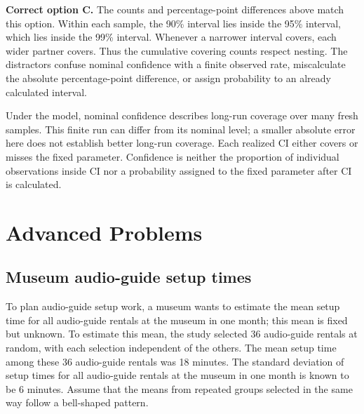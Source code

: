 \textbf{Correct option C.} The counts and percentage-point differences above match this option. Within each sample, the 90\% interval lies inside the 95\% interval, which lies inside the 99\% interval. Whenever a narrower interval covers, each wider partner covers. Thus the cumulative covering counts respect nesting. The distractors confuse nominal confidence with a finite observed rate, miscalculate the absolute percentage-point difference, or assign probability to an already calculated interval.

Under the model, nominal confidence describes long-run coverage over many fresh samples. This finite run can differ from its nominal level; a smaller absolute error here does not establish better long-run coverage. Each realized $\mathrm{CI}$ either covers or misses the fixed parameter. Confidence is neither the proportion of individual observations inside $\mathrm{CI}$ nor a probability assigned to the fixed parameter after $\mathrm{CI}$ is calculated.
\par\nopagebreak[4]
\par\vspace{3mm}
\clearpage
\section{Advanced Problems}
\label{sec:advanced}

\subsection{Museum audio-guide setup times}
\label{prob:c2-advanced-a}

To plan audio-guide setup work, a museum wants to estimate the mean setup time for all audio-guide rentals at the museum in one month; this mean is fixed but unknown. To estimate this mean, the study selected 36 audio-guide rentals at random, with each selection independent of the others. The mean setup time among these 36 audio-guide rentals was 18 minutes. The standard deviation of setup times for all audio-guide rentals at the museum in one month is known to be 6 minutes. Assume that the means from repeated groups selected in the same way follow a bell-shaped pattern.

